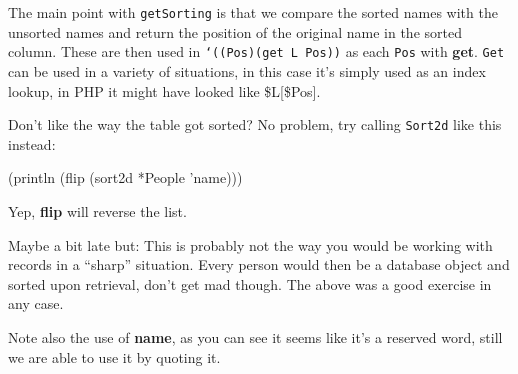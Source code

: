 The main point with \texttt{getSorting} is that we compare the sorted
names with the unsorted names and return the position of the original
name in the sorted column. These are then used in \texttt{‘((Pos)(get
  L Pos))} as each \texttt{Pos} with \textbf{get}. \texttt{Get} can be
used in a variety of situations, in this case it's simply used as an
index lookup, in PHP it might have looked like \$L[\$Pos].

Don't like the way the table got sorted? No problem, try calling
\texttt{Sort2d} like this instead:


\begin{wideverbatim}
(println (flip (sort2d *People 'name)))
\end{wideverbatim}

Yep, \textbf{flip} will reverse the list.

Maybe a bit late but: This is probably not the way you would be working
with records in a ``sharp'' situation. Every person would then be a
database object and sorted upon retrieval, don't get mad though. The
above was a good exercise in any case.

Note also the use of \textbf{name}, as you can see it seems like it's a
reserved word, still we are able to use it by quoting it.

